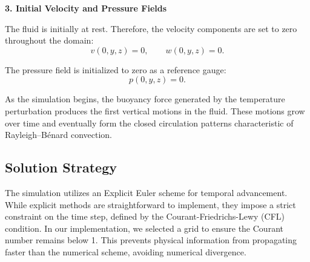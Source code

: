 \textbf{3. Initial Velocity and Pressure Fields}

The fluid is initially at rest. Therefore, the velocity components are set to zero throughout the domain:
\begin{equation}
v(0,y,z) = 0, \qquad w(0,y,z) = 0 .
\end{equation}

The pressure field is initialized to zero as a reference gauge:
\begin{equation}
p(0,y,z) = 0 .
\end{equation}

As the simulation begins, the buoyancy force generated by the temperature perturbation produces the first vertical motions in the fluid. These motions grow over time and eventually form the closed circulation patterns characteristic of Rayleigh--Bénard convection.



\subsection{Solution Strategy}

The simulation utilizes an Explicit Euler scheme for temporal advancement. While explicit methods are straightforward to implement, they impose a strict constraint on the time step, defined by the Courant-Friedrichs-Lewy (CFL) condition. In our implementation, we selected a grid to ensure the Courant number remains below 1. This prevents physical information from propagating faster than the numerical scheme, avoiding numerical divergence.